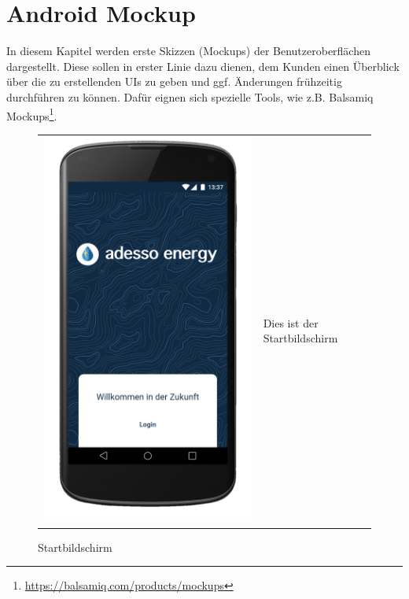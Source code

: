 \section{Android Mockup}

\begin{tcolorbox}
In diesem Kapitel werden erste Skizzen (Mockups) der Benutzeroberflächen dargestellt.
Diese sollen in erster Linie dazu dienen, dem Kunden einen Überblick über die zu erstellenden UIs zu geben und ggf. Änderungen frühzeitig durchführen zu können.
Dafür eignen sich spezielle Tools, wie z.B. Balsamiq Mockups\footnote{\url{https://balsamiq.com/products/mockups}}.
\end{tcolorbox}


\begin{figure}[h]
\begin{tabularx}{\textwidth}{X  X}
	\includegraphics[scale = 0.155]{img/AndroidMockup/splash}  \caption {Startbildschirm} &  Dies ist der Startbildschirm \\

\end{tabularx}
\end{figure}
